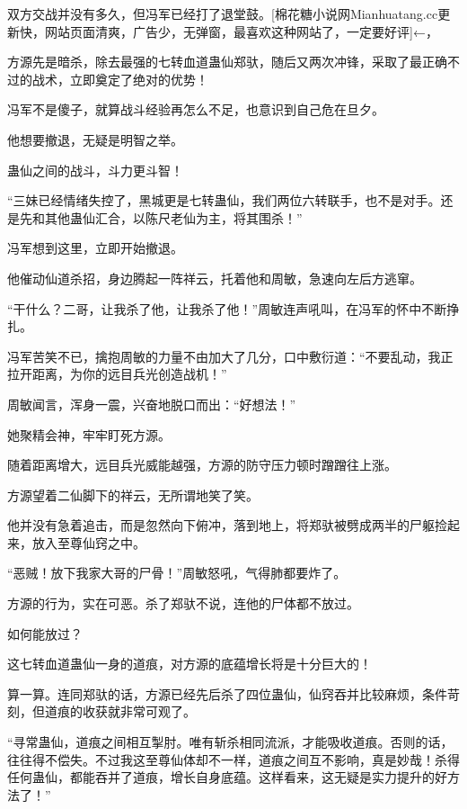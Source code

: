 
\begin{this_body}

双方交战并没有多久，但冯军已经打了退堂鼓。[棉花糖小说网Mianhuatang.cc更新快，网站页面清爽，广告少，无弹窗，最喜欢这种网站了，一定要好评]←，

方源先是暗杀，除去最强的七转血道蛊仙郑驮，随后又两次冲锋，采取了最正确不过的战术，立即奠定了绝对的优势！

冯军不是傻子，就算战斗经验再怎么不足，也意识到自己危在旦夕。

他想要撤退，无疑是明智之举。

蛊仙之间的战斗，斗力更斗智！

“三妹已经情绪失控了，黑城更是七转蛊仙，我们两位六转联手，也不是对手。还是先和其他蛊仙汇合，以陈尺老仙为主，将其围杀！”

冯军想到这里，立即开始撤退。

他催动仙道杀招，身边腾起一阵祥云，托着他和周敏，急速向左后方逃窜。

“干什么？二哥，让我杀了他，让我杀了他！”周敏连声吼叫，在冯军的怀中不断挣扎。

冯军苦笑不已，擒抱周敏的力量不由加大了几分，口中敷衍道：“不要乱动，我正拉开距离，为你的远目兵光创造战机！”

周敏闻言，浑身一震，兴奋地脱口而出：“好想法！”

她聚精会神，牢牢盯死方源。

随着距离增大，远目兵光威能越强，方源的防守压力顿时蹭蹭往上涨。

方源望着二仙脚下的祥云，无所谓地笑了笑。

他并没有急着追击，而是忽然向下俯冲，落到地上，将郑驮被劈成两半的尸躯捡起来，放入至尊仙窍之中。

“恶贼！放下我家大哥的尸骨！”周敏怒吼，气得肺都要炸了。

方源的行为，实在可恶。杀了郑驮不说，连他的尸体都不放过。

如何能放过？

这七转血道蛊仙一身的道痕，对方源的底蕴增长将是十分巨大的！

算一算。连同郑驮的话，方源已经先后杀了四位蛊仙，仙窍吞并比较麻烦，条件苛刻，但道痕的收获就非常可观了。

“寻常蛊仙，道痕之间相互掣肘。唯有斩杀相同流派，才能吸收道痕。否则的话，往往得不偿失。不过我这至尊仙体却不一样，道痕之间互不影响，真是妙哉！杀得任何蛊仙，都能吞并了道痕，增长自身底蕴。这样看来，这无疑是实力提升的好方法了！”


\end{this_body}
